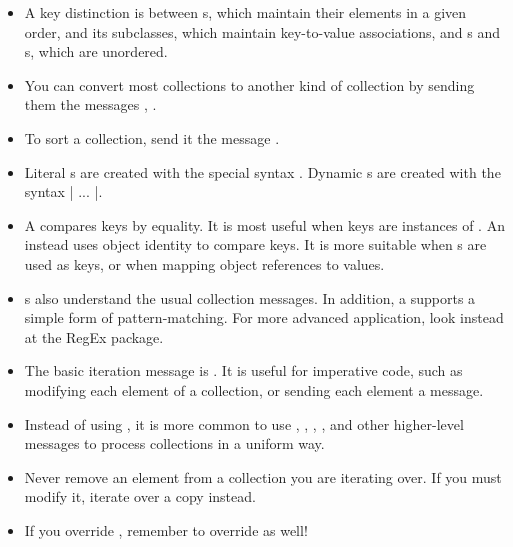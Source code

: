\documentclass[a4paper,10pt,twoside]{book}
\begin{document}
\begin{itemize}
  \item A key distinction is between s, which maintain their elements in a given order,  and its subclasses, which maintain key-to-value associations, and s and s, which are unordered.
  \item You can convert most collections to another kind of collection by sending them the messages ,  \etc.
  \item To sort a collection, send it the message .
  \item Literal s are created with the special syntax .  Dynamic s are created with the syntax \ct|{ ... }|.
  \item A  compares keys by equality. It is most useful when keys are instances of . An  instead uses object identity to compare keys.  It is more suitable when s are used as keys, or when mapping object references to values.
  \item {}s also understand the usual collection messages.  In addition, a  supports a simple form of pattern-matching. For more advanced application, look instead at the RegEx package.
  \item The basic iteration message is . It is useful for imperative code, such as modifying each element of a collection, or sending each element a message.
  \item Instead of using , it is more common to use , , , ,  and other higher-level messages to process collections in a uniform way.
  \item Never remove an element from a collection you are iterating over. If you must modify it, iterate over a copy instead.
  \item If you override \ct{=}, remember to override  as well!
\end{itemize}

\ifx\wholebook\relax\else
   
   
\end{document}
